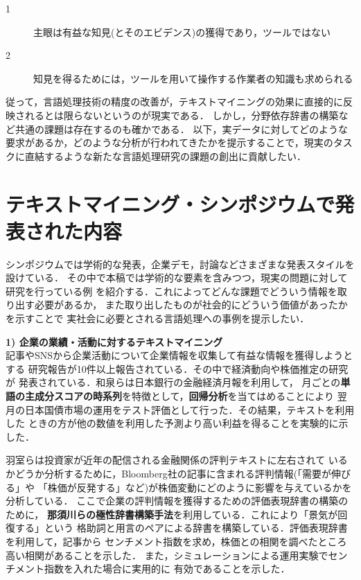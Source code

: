 \documentclass[twocolumn]{jarticle}
\begin{document}
\begin{description}
\item[1] 主眼は有益な知見(とそのエビデンス)の獲得であり，ツールではない
\item[2] 知見を得るためには，ツールを用いて操作する作業者の知識も求められる
\end{description}

従って，言語処理技術の精度の改善が，テキストマイニングの効果に直接的に反映されるとは限らないというのが現実である．
しかし，分野依存辞書の構築\cite{nasukawa04}など共通の課題は存在するのも確かである．
以下，実データに対してどのような要求があるか，どのような分析が行われてきたかを提示することで，現実のタスクに直結するような新たな言語処理研究の課題の創出に貢献したい．


\section{テキストマイニング・シンポジウムで発表された内容}
シンポジウムでは学術的な発表，企業デモ，討論などさまざまな発表スタイルを設けている．
その中で本稿では学術的な要素を含みつつ，現実の問題に対して研究を行っている例
を紹介する．これによってどんな課題でどういう情報を取り出す必要があるか，
また取り出したものが社会的にどういう価値があったかを示すことで
実社会に必要とされる言語処理への事例を提示したい．

{\bf 1) 企業の業績・活動に対するテキストマイニング}\\
記事やSNSから企業活動について企業情報を収集して有益な情報を獲得しようとする
研究報告が10件以上報告されている．その中で経済動向や株価推定の研究が
発表されている．和泉ら\cite{izumi2011}は日本銀行の金融経済月報を利用して，
月ごとの{\bf 単語の主成分スコアの時系列}を特徴として，{\bf 回帰分析}を当てはめることにより
翌月の日本国債市場の運用をテスト評価として行った．その結果，テキストを利用した
ときの方が他の数値を利用した予測より高い利益を得ることを実験的に示した．

羽室ら\cite{hamuro2011}は投資家が近年の配信される金融関係の評判テキストに左右されて
いるかどうか分析するために，Bloomberg社の記事に含まれる評判情報(「需要が伸びる」や
「株価が反発する」など)が株価変動にどのように影響を与えているかを分析している．
ここで企業の評判情報を獲得するための評価表現辞書の構築のために，
{\bf 那須川ら\cite{nasukawa04}の極性辞書構築手法}を利用している．これにより「景気が回復する」という
格助詞と用言のペアによる辞書を構築している．評価表現辞書を利用して，記事から
センチメント指数を求め，株価との相関を調べたところ高い相関があることを示した．
また，シミュレーションによる運用実験でセンチメント指数を入れた場合に実用的に
有効であることを示した．
\end{document}
